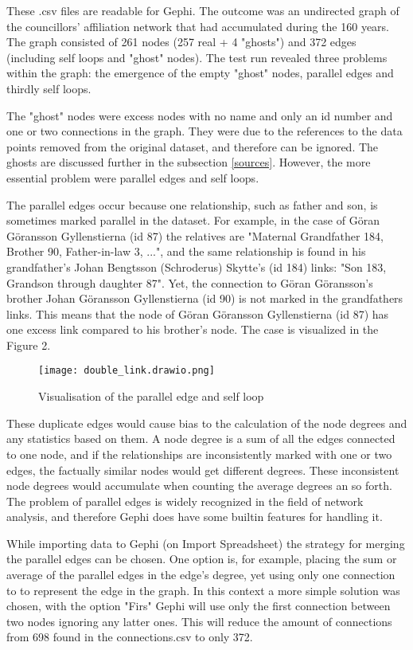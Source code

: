 These .csv files are readable for Gephi. The outcome was an undirected graph of the councillors' affiliation network that had accumulated during the 160 years. The graph consisted of 261 nodes (257 real + 4 "ghosts") and 372 edges (including self loops and "ghost" nodes). The test run revealed three problems within the graph: the emergence of the empty "ghost" nodes, parallel edges and thirdly self loops. 

The "ghost" nodes were excess nodes with no name and only an id number and one or two connections in the graph. They were due to the references to the data points removed from the original dataset, and therefore can be ignored. The ghosts are discussed further in the subsection \ref{sources}. However, the more essential problem were parallel edges and self loops.

The parallel edges occur because one relationship, such as father and son, is sometimes marked parallel in the dataset. For example, in the case of Göran Göransson Gyllenstierna (id 87) the relatives are "Maternal Grandfather 184, Brother 90, Father-in-law 3, ...", and the same relationship is found in his grandfather's Johan Bengtsson (Schroderus) Skytte's (id 184) links: "Son 183, Grandson through daughter 87". Yet, the connection to Göran Göransson's brother Johan Göransson Gyllenstierna (id 90) is not marked in the grandfathers links. This means that the node of Göran Göransson Gyllenstierna (id 87) has one excess link compared to his brother's node. The case is visualized in the Figure 2.

\begin{figure}[h]
	\texttt{[image: double\_link.drawio.png]}
	\centering
	\caption{Visualisation of the parallel edge and self loop} 
	\centering
\end{figure}

These duplicate edges would cause bias to the calculation of the node degrees and any statistics based on them. A node degree is a sum of all the edges connected to one node, and if the relationships are inconsistently marked with one or two edges, the factually similar nodes would get different degrees. These inconsistent node degrees would accumulate when counting the average degrees an so forth. The problem of parallel edges is widely recognized in the field of network analysis, and therefore Gephi does have some builtin features for handling it.

While importing data to Gephi (on Import Spreadsheet) the strategy for merging the parallel edges can be chosen. One option is, for example, placing the sum or average of the parallel edges in the edge's degree, yet using only one connection to to represent the edge in the graph. In this context a more simple solution was chosen, with the option "Firs" Gephi will use only the first connection between two nodes ignoring any latter ones. This will reduce the amount of connections from 698 found in the connections.csv to only 372.

